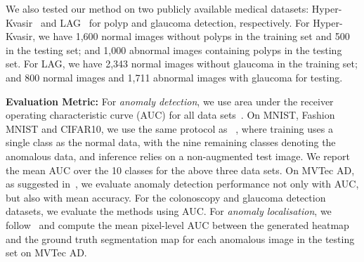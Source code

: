 \documentclass[final]{cvpr}
\begin{document}
We also tested our method on two publicly available medical datasets: Hyper-Kvasir~\cite{borgli2020hyperkvasir} and LAG~\cite{li2019attention} for polyp and glaucoma detection, respectively. For Hyper-Kvasir, we have 1,600 normal images without polyps in the training set and 500 in the testing set; and 1,000 abnormal images containing polyps in the testing set. For LAG, we have 2,343 normal images without glaucoma in the training set; and 800 normal images and 1,711 abnormal images with glaucoma for testing. 






\textbf{Evaluation Metric:} For \emph{anomaly detection}, we use area under the receiver operating characteristic curve (AUC) for all data sets~\cite{ocgan,ADGAN,lsa,dsvdd,venkataramanan2019attention,bergmann2020uninformed,gong2019memorizing}. 
On MNIST, Fashion MNIST and CIFAR10, we use the same protocol as~\cite{ocgan,dsvdd,lsa,venkataramanan2019attention,bergmann2020uninformed,golan2018deep,bergman2020classification}
, where training uses a single class as the normal data, with the nine remaining classes denoting the anomalous data, and inference relies on a non-augmented test image. 
We report the mean AUC over the 10 classes for the above three data sets. On MVTec AD, as suggested in~\cite{bergmann2020uninformed,venkataramanan2019attention}, we evaluate anomaly detection performance not only with AUC, but also with mean accuracy. For the colonoscopy and glaucoma detection datasets, we evaluate the methods using AUC. 
For \emph{anomaly localisation}, we follow~\cite{venkataramanan2019attention} and compute the mean pixel-level AUC between the generated heatmap and the ground truth segmentation map for each anomalous image in the testing set on MVTec AD.
\end{document}

